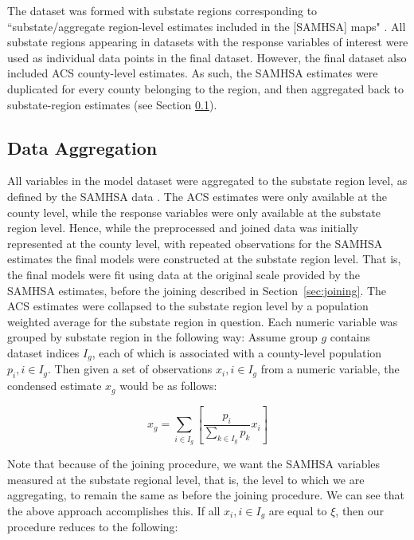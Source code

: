 \documentclass{article}
\begin{document}
The dataset was formed with substate regions corresponding to
``substate/aggregate region-level estimates included in the [SAMHSA] maps"
\cite{samhsa_data}. All substate regions appearing in datasets with the response
variables of interest were used as individual data points in the final dataset.
However, the final dataset also included ACS county-level estimates. As such,
the SAMHSA estimates were duplicated for every county belonging to the region,
and then aggregated back to substate-region estimates (see Section
\ref{sec:aggregation}).

\subsection{Data Aggregation}\label{sec:aggregation}

All variables in the model dataset were aggregated to the substate region level,
as defined by the SAMHSA data \cite{samhsa_substate_region_defs}.
The ACS estimates were only available at the county level,
while the response variables were only available at the substate region level.
Hence, while the preprocessed and joined data was
initially represented at the county level,
with repeated observations for the SAMHSA estimates
the final models were constructed at the substate region level.
That is, the final models were fit using data at the original
scale provided by the SAMHSA estimates, before the joining described in
Section~\ref{sec:joining}.
The ACS estimates were collapsed to the substate region level
by a population weighted average for the substate region in question.
Each numeric variable was grouped by substate region
in the following way:
Assume group $g$ contains dataset indices $I_g$,
each of which is associated with a county-level population
$p_{i}, i \in I_g$.
Then given a set of observations $x_{i}, i \in I_g$
from a numeric variable,
the condensed estimate $x_g$ would be as follows:

\begin{equation*}
    x_g = \sum_{i \in I_g}
    \left[ \frac{p_{i}}{\sum_{k \in I_g} p_{k}} x_i \right]
\end{equation*}

Note that because of the joining procedure,
we want the SAMHSA variables measured at the substate regional level,
that is, the level to which we are aggregating,
to remain the same as before the joining procedure.
We can see that the above approach accomplishes this.
If all $x_i, i \in I_g$ are equal to $\xi$,
then our procedure reduces to the following:
\end{document}
